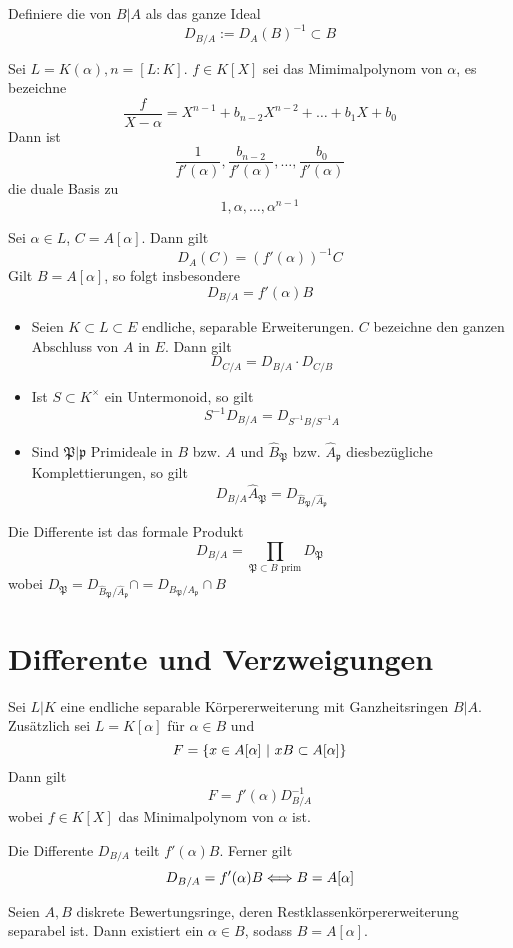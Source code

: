 \documentclass{book}
\renewcommand{\i}{^{-1}}
\newcommand{\pf}{\mathfrak{p}}
\newcommand{\Pf}{\mathfrak{P}}
\begin{document}
\Def{}
Definiere die  von $B|A$ als das ganze Ideal
\[ D_{B/A} := D_A(B)\i \subset B \]

\Satz{}
Sei $L = K(\alpha), n = [L:K]$. $f \in K[X]$ sei das Mimimalpolynom von $\alpha$, es bezeichne
\[ \frac{f}{X-\alpha} = X^{n-1} + b_{n-2}X^{n-2} + \ldots + b_1X + b_0 \]
Dann ist
\[ \frac{1}{f'(\alpha)}, \frac{b_{n-2}}{f'(\alpha)}, \ldots , \frac{b_{0}}{f'(\alpha)} \]
die duale Basis zu
\[ 1, \alpha, \ldots, \alpha^{n-1} \]

\Kor{}
Sei $\alpha \in L$, $C = A[\alpha]$. Dann gilt
\[ D_A(C) = (f'(\alpha))\i C \]
Gilt $B = A[\alpha]$, so folgt insbesondere
\[ D_{B/A} = f'(\alpha)B \]

\Satz{}
\begin{itemize}
	\item Seien $K\subset L\subset E$ endliche, separable Erweiterungen. $C$ bezeichne den ganzen Abschluss von $A$ in $E$. Dann gilt
	\[ D_{C/A} = D_{B/A} \cdot D_{C/B} \]
	\item Ist $S \subset K^\times$ ein Untermonoid, so gilt
	\[ S\i D_{B/A} = D_{S\i B / S\i A} \]
	\item Sind $\Pf |\pf$ Primideale in $B$ bzw. $A$ und $\widehat{B}_\Pf$ bzw. $\widehat{A}_\pf$ diesbezügliche Komplettierungen, so gilt
	\[ D_{B/A} \widehat{A}_\Pf = D_{\widehat{B}_\Pf / \widehat{A}_\pf} \]
\end{itemize}

\Kor{}
Die Differente ist das formale Produkt
\[ D_{B/A} = \prod_{ \Pf \subset B \text{ prim}} D_\Pf \]
wobei $D_\Pf = D_{\widehat{B}_\Pf / \widehat{A}_\pf} \cap = D_{B_\Pf / A_\pf}\cap B $

\section{Differente und Verzweigungen}
\Lem{}
Sei $L|K$ eine endliche separable Körpererweiterung mit Ganzheitsringen $B|A$.\\
Zusätzlich sei $L = K[\alpha]$ für $\alpha \in B$ und
\[ F= \set{x \in A[\alpha]}{xB \subset A[\alpha]} \]
Dann gilt
\[ F = f'(\alpha)D\i_{B/A} \]
wobei $f\in K[X]$ das Minimalpolynom von $\alpha$ ist.

\Kor{}
Die Differente $D_{B/A}$ teilt $f'(\alpha) B$. Ferner gilt
\[ D_{B/A} = f'(\alpha) B \overset{}{\Longleftrightarrow} B = A[\alpha] \]

\Satz{}
Seien $A,B$ diskrete Bewertungsringe, deren Restklassenkörpererweiterung separabel ist. Dann existiert ein $\alpha \in B$, sodass $B = A[\alpha]$.
\end{document}
